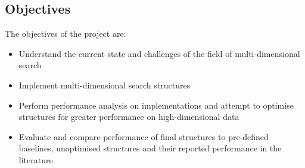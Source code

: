 \subsection{Objectives}

The objectives of the project are:
\begin{itemize}
	\item Understand the current state and challenges of the field of multi-dimensional search
	\item Implement multi-dimensional search structures
	\item Perform performance analysis on implementations and attempt to optimise structures for greater performance on high-dimensional data
	\item Evaluate and compare performance of final structures to pre-defined baselines, unoptimised structures and their reported performance in the literature
\end{itemize}
